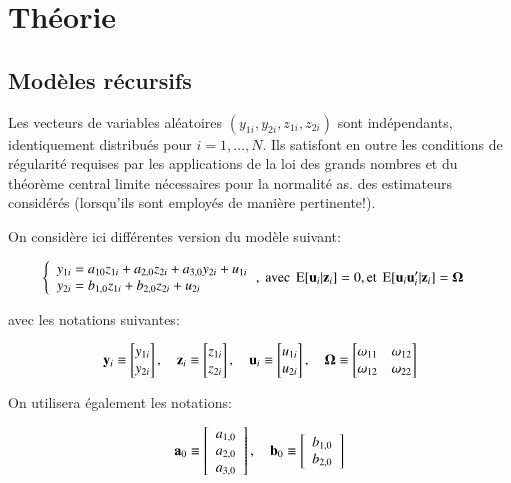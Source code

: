 \section{Théorie}

\subsection{Modèles récursifs}
Les vecteurs de variables aléatoires $(y_{1i},y_{2i},z_{1i},z_{2i})$ sont indépendants, identiquement distribués pour 
$i= 1,\ldots, N$. Ils satisfont en outre les conditions de régularité requises par les applications de la loi
 des grands nombres et du théorème central limite nécessaires pour la normalité as. des estimateurs considérés 
 (lorsqu’ils sont employés de manière pertinente!). 

 On considère ici différentes version du modèle suivant:

    
 \begin{align}
    \left\{
 \begin{array}{l}
    y_{1i} = a_{10}z_{1i} + a_{2,0}z_{2i} + a_{3,0}y_{2i} +u_{1i}\\
    y_{2i}= b_{1,0}z_{1i} + b_{2,0}z_{2i}+u_{2i}
 \end{array}
\right.
&, \ \text{avec} \  \Exp[\boldu_i|\boldz_i] =0,  \text{et} \ \Exp[\boldu_i\boldu_i^\prime|\boldz_i]=\boldOmega
\label{eq1}
 \end{align}

 avec les notations suivantes:

 \[
    {\mathbf y}_i \equiv 
    \begin{bmatrix}
        y_{1i}\\
        y_{2i}
    \end{bmatrix}
    , \quad 
    {\mathbf z}_i \equiv 
\begin{bmatrix}
    z_{1i}\\
    z_{2i}
\end{bmatrix}
, \quad 
{\mathbf u}_i \equiv 
\begin{bmatrix}
    u_{1i}\\
    u_{2i}
\end{bmatrix}
, \quad 
{\boldsymbol \Omega} \equiv
\begin{bmatrix}
    \omega_{11}&\omega_{12}\\
    \omega_{12}&\omega_{22}
\end{bmatrix}
 \]
    
 On utilisera également les notations:


 \begin{align*}
    {\mathbf a}_0 \equiv 
    \left[
    \begin{array}{l}
        a_{1,0}\\
        a_{2, 0}\\
        a_{3, 0}
    \end{array}
    \right]
    , \quad 
    {\mathbf b}_0 \equiv 
 \left[
 \begin{array}{l}
    b_{1,0}\\
    b_{2,0}
\end{array}
 \right]
\end{align*}

